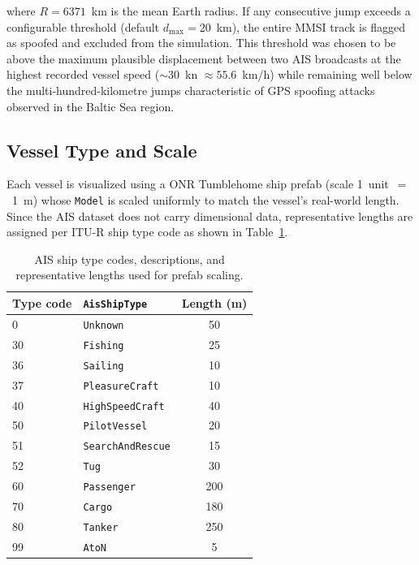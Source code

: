 \noindent where $R = 6371$~km is the mean Earth radius. If any consecutive jump exceeds a configurable threshold (default $d_{\max} = 20$~km), the entire MMSI track is flagged as spoofed and excluded from the simulation. This threshold was chosen to be above the maximum plausible displacement between two AIS broadcasts at the highest recorded vessel speed (${\sim}30$~kn $\approx 55.6$~km/h) while remaining well below the multi-hundred-kilometre jumps characteristic of GPS spoofing attacks observed in the Baltic Sea region.

\subsection{Vessel Type and Scale}

Each vessel is visualized using a ONR Tumblehome \cite{W2025_ONRT} ship prefab (scale 1~unit~$=$~1~m) whose \texttt{Model} is scaled uniformly to match the vessel's real-world length. Since the AIS dataset does not carry dimensional data, representative lengths are assigned per ITU-R ship type code as shown in Table~\ref{tab:ship_types}.

\begin{table}[h]
\centering
\caption{AIS ship type codes, descriptions, and representative lengths used for prefab scaling.}
\label{tab:ship_types}
\begin{tabular}{llc}
\hline
\textbf{Type code} & \textbf{\texttt{AisShipType}} & \textbf{Length (m)} \\
\hline
0   & \texttt{Unknown}         & 50  \\
30  & \texttt{Fishing}         & 25  \\
36  & \texttt{Sailing}         & 10  \\
37  & \texttt{PleasureCraft}   & 10  \\
40  & \texttt{HighSpeedCraft}  & 40  \\
50  & \texttt{PilotVessel}     & 20  \\
51  & \texttt{SearchAndRescue} & 15  \\
52  & \texttt{Tug}             & 30  \\
60  & \texttt{Passenger}       & 200 \\
70  & \texttt{Cargo}           & 180 \\
80  & \texttt{Tanker}          & 250 \\
99  & \texttt{AtoN}            & 5   \\
\hline
\end{tabular}
\end{table}


